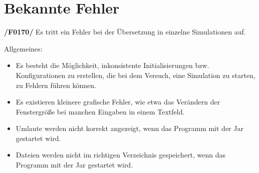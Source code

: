 \section{Bekannte Fehler}

\textbf{/F0170/}
Es tritt ein Fehler bei der Übersetzung in einzelne Simulationen auf.



Allgemeines:
\begin{itemize}
\item Es besteht die Möglichkeit, inkonsistente Initialisierungen bzw. Konfigurationen zu erstellen, die bei dem Versuch, eine Simulation zu starten, zu Fehlern führen können.

\item Es existieren kleinere grafische Fehler, wie etwa das Verändern der Fenstergröße bei manchen Eingaben in einem Textfeld.

\item Umlaute werden nicht korrekt angezeigt, wenn das Programm mit der Jar gestartet wird.

\item Dateien werden nicht im richtigen Verzeichnis gespeichert, wenn das Programm mit der Jar gestartet wird.
\end{itemize}